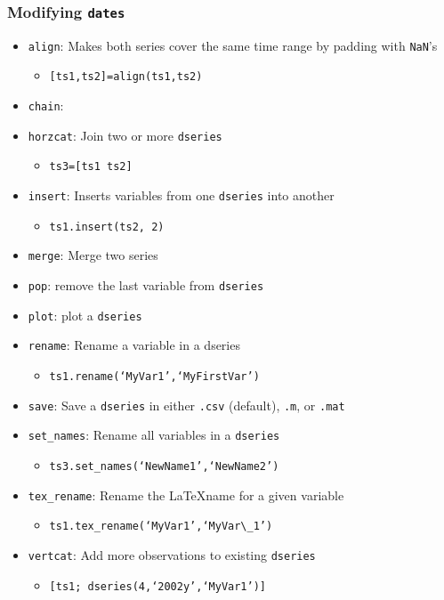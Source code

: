 \documentclass[10pt]{beamer}
\begin{document}
\begin{frame}[fragile,t]
  \frametitle{Modifying \texttt{dates}}
  \begin{itemize}
  \item \texttt{align}: Makes both series cover the same time range by padding with \texttt{NaN}'s
    \begin{itemize}
    \item \texttt{[ts1,ts2]=align(ts1,ts2)}
    \end{itemize}
  \item \texttt{chain}:
  \item \texttt{horzcat}: Join two or more \texttt{dseries}
    \begin{itemize}
    \item \texttt{ts3=[ts1 ts2]}
    \end{itemize}
  \item \texttt{insert}: Inserts variables from one \texttt{dseries} into another
    \begin{itemize}
    \item \texttt{ts1.insert(ts2, 2)}
    \end{itemize}
  \item \texttt{merge}: Merge two series
  \item \texttt{pop}: remove the last variable from \texttt{dseries}
  \item \texttt{plot}: plot a \texttt{dseries}
  \item \texttt{rename}: Rename a variable in a dseries
    \begin{itemize}
    \item \texttt{ts1.rename(`MyVar1',`MyFirstVar')}
    \end{itemize}
  \item \texttt{save}: Save a \texttt{dseries} in either \texttt{.csv} (default), \texttt{.m}, or \texttt{.mat}
  \item \texttt{set\_names}: Rename all variables in a \texttt{dseries}
    \begin{itemize}
    \item \texttt{ts3.set\_names(`NewName1',`NewName2')}
    \end{itemize}
  \item \texttt{tex\_rename}: Rename the \LaTeX name for a given variable
    \begin{itemize}
    \item \texttt{ts1.tex\_rename(`MyVar1',`MyVar\textbackslash\_1')}
    \end{itemize}
  \item \texttt{vertcat}: Add more observations to existing \texttt{dseries}
    \begin{itemize}
    \item \texttt{[ts1; dseries(4,`2002y',`MyVar1')]}
    \end{itemize}
  \end{itemize}
\end{frame}
\end{document}
